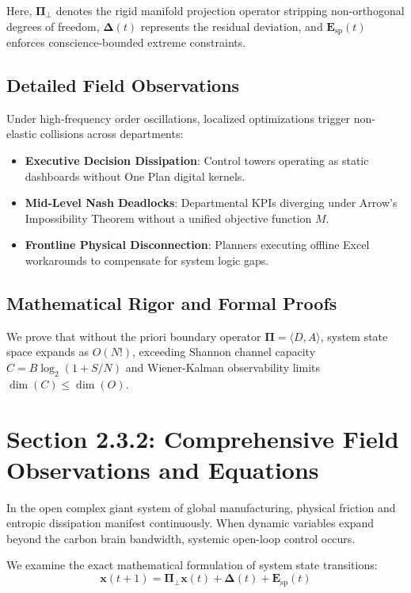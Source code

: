 \documentclass[12pt,a4paper,oneside]{book}
\begin{document}
Here, $\mathbf{\Pi}_{\bot}$ denotes the rigid manifold projection operator stripping non-orthogonal degrees of freedom, $\mathbf{\Delta}(t)$ represents the residual deviation, and $\mathbf{E}_{\mathrm{sp}}(t)$ enforces conscience-bounded extreme constraints.

\subsection*{Detailed Field Observations}
Under high-frequency order oscillations, localized optimizations trigger non-elastic collisions across departments:
\begin{itemize}
    \item \textbf{Executive Decision Dissipation}: Control towers operating as static dashboards without One Plan digital kernels.
    \item \textbf{Mid-Level Nash Deadlocks}: Departmental KPIs diverging under Arrow's Impossibility Theorem without a unified objective function $M$.
    \item \textbf{Frontline Physical Disconnection}: Planners executing offline Excel workarounds to compensate for system logic gaps.
\end{itemize}

\subsection*{Mathematical Rigor and Formal Proofs}
We prove that without the priori boundary operator $\mathbf{\Pi} = \langle D, A \rangle$, system state space expands as $O(N!)$, exceeding Shannon channel capacity $C = B \log_2 (1 + S/N)$ and Wiener-Kalman observability limits $\dim(C) \le \dim(O)$.
\clearpage
\section{Section 2.3.2: Comprehensive Field Observations and Equations}

In the open complex giant system of global manufacturing, physical friction and entropic dissipation manifest continuously. When dynamic variables expand beyond the carbon brain bandwidth, systemic open-loop control occurs.

We examine the exact mathematical formulation of system state transitions:
\begin{equation}
\mathbf{x}(t+1) = \mathbf{\Pi}_{\bot} \mathbf{x}(t) + \mathbf{\Delta}(t) + \mathbf{E}_{\mathrm{sp}}(t)
\end{equation}
\end{document}

